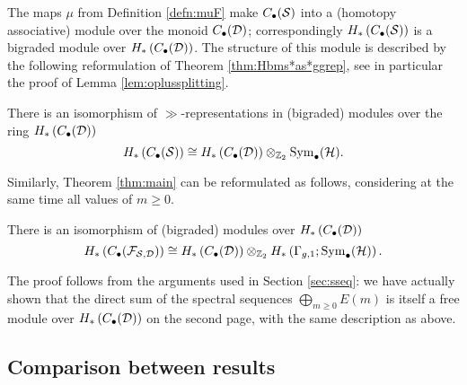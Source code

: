 The maps $\mu$ from Definition \ref{defn:muF} make $C_{\bullet}(\S)$ into a (homotopy associative)
module over the monoid $C_{\bullet}(\D)$; correspondingly $H_*\pa{C_{\bullet}(\S)}$ is a bigraded
module over $H_*\pa{C_{\bullet}(\D)}$. The structure of this module is described by the following
reformulation of Theorem \ref{thm:Hbms*as*ggrep}, see in particular the proof of Lemma \ref{lem:oplussplitting}.

\begin{thm}
 \label{thm:firstreformulation}
 There is an isomorphism of $\gg$-representations in (bigraded) modules over the ring $H_*\pa{C_{\bullet}(\D)}$
 \[
  H_*\pa{C_{\bullet}(\S)}\cong   H_*\pa{C_{\bullet}(\D)}\otimes_{\Z_2}\Sym_{\bullet}(\H).
 \]
\end{thm}

Similarly, Theorem \ref{thm:main} can be reformulated as follows, considering at the same time all values of $m\geq 0$.
\begin{thm}
 \label{thm:mainreformulation}
 There is an isomorphism of (bigraded) modules over $H_*\pa{C_{\bullet}(\D)}$
 \[
 H_*\pa{C_{\bullet}(\cF_{\S,\D})}\cong   H_*\pa{C_{\bullet}(\D)}\otimes_{\Z_2}H_*\pa{\gg;\Sym_{\bullet}(\H)}.
 \] 
\end{thm}
The proof follows from the arguments used in Section \ref{sec:sseq}: we have actually shown that the direct
sum of the spectral sequences $\bigoplus_{m\geq 0} E(m)$ is itself a free module over $H_*\pa{C_{\bullet}(\D)}$
on the second page, with the same description as above.

\subsection{Comparison between results}
\label{subsec:comparison}
